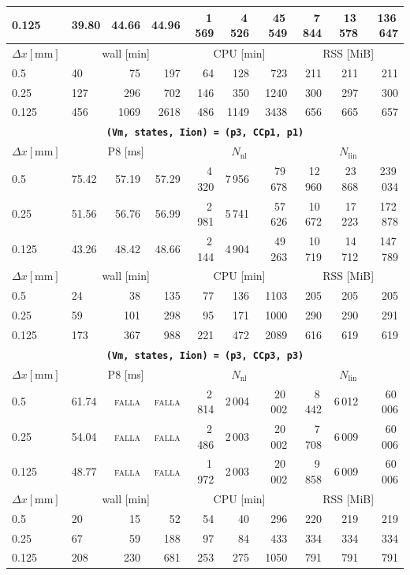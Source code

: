 \documentclass[11pt,a4paper]{article}
\newcommand{\code}[1]{\texttt{\small #1}}
\begin{document}
\begin{center}
\begin{longtable}{l|lrr|rrr|rrr}
0.125 & 39.80 & 44.66 & 44.96 & 1\,569 & 4\,526 & 45\,549 & 7\,844 & 13\,578 & 136\,647\\
\hline
$ \Delta x [\text{mm}] $ & \multicolumn{3}{c|}{wall [min]} & \multicolumn{3}{c|}{CPU [min]} & \multicolumn{3}{c|}{RSS [MiB]}\\
0.5 & 40 & 75 & 197 & 64 & 128 & 723 & 211 & 211 & 211\\
0.25 & 127 & 296 & 702 & 146 & 350 & 1240 & 300 & 297 & 300\\
0.125 & 456 & 1069 & 2618 & 486 & 1149 & 3438 & 656 & 665 & 657\\
\hline
\hline
\multicolumn{10}{c}{\textbf{\code{(Vm, states, Iion) = (p3, CCp1, p1)}}}\\\hline
$ \Delta x [\text{mm}] $ & \multicolumn{3}{c|}{P8 [ms]} & \multicolumn{3}{c|}{$N_{\mathrm{nl}}$} & \multicolumn{3}{c|}{$N_{\mathrm{lin}}$}\\
0.5 & 75.42 & 57.19 & 57.29 & 4\,320 & 7\,956 & 79\,678 & 12\,960 & 23\,868 & 239\,034\\
0.25 & 51.56 & 56.76 & 56.99 & 2\,981 & 5\,741 & 57\,626 & 10\,672 & 17\,223 & 172\,878\\
0.125 & 43.26 & 48.42 & 48.66 & 2\,144 & 4\,904 & 49\,263 & 10\,719 & 14\,712 & 147\,789\\
\hline
$ \Delta x [\text{mm}] $ & \multicolumn{3}{c|}{wall [min]} & \multicolumn{3}{c|}{CPU [min]} & \multicolumn{3}{c|}{RSS [MiB]}\\
0.5 & 24 & 38 & 135 & 77 & 136 & 1103 & 205 & 205 & 205\\
0.25 & 59 & 101 & 298 & 95 & 171 & 1000 & 290 & 290 & 291\\
0.125 & 173 & 367 & 988 & 221 & 472 & 2089 & 616 & 619 & 619\\
\hline
\hline
\multicolumn{10}{c}{\textbf{\code{(Vm, states, Iion) = (p3, CCp3, p3)}}}\\\hline
$ \Delta x [\text{mm}] $ & \multicolumn{3}{c|}{P8 [ms]} & \multicolumn{3}{c|}{$N_{\mathrm{nl}}$} & \multicolumn{3}{c|}{$N_{\mathrm{lin}}$}\\
0.5 & 61.74 & \textsc{falla} & \textsc{falla} & 2\,814 & 2\,004 & 20\,002 & 8\,442 & 6\,012 & 60\,006\\
0.25 & 54.04 & \textsc{falla} & \textsc{falla} & 2\,486 & 2\,003 & 20\,002 & 7\,708 & 6\,009 & 60\,006\\
0.125 & 48.77 & \textsc{falla} & \textsc{falla} & 1\,972 & 2\,003 & 20\,002 & 9\,858 & 6\,009 & 60\,006\\
\hline
$ \Delta x [\text{mm}] $ & \multicolumn{3}{c|}{wall [min]} & \multicolumn{3}{c|}{CPU [min]} & \multicolumn{3}{c|}{RSS [MiB]}\\
0.5 & 20 & 15 & 52 & 54 & 40 & 296 & 220 & 219 & 219\\
0.25 & 67 & 59 & 188 & 97 & 84 & 433 & 334 & 334 & 334\\
0.125 & 208 & 230 & 681 & 253 & 275 & 1050 & 791 & 791 & 791\\
\hline
\bottomrule\end{longtable}\end{center}
\end{document}
